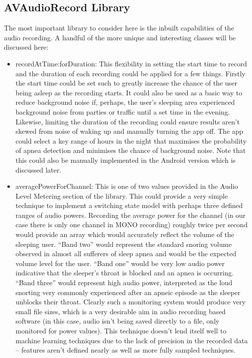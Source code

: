 \subsection{AVAudioRecord Library}
The most important library to consider here is the inbuilt capabilities of the audio recording. A handful of the more unique and interesting classes will be discussed here:
\begin{itemize}
\item recordAtTime:forDuration: This flexibility in setting the start time to record and the duration of each recording could be applied for a few things. Firstly the start time could be set such to greatly increase the chance of the user being asleep as the recording starts. It could also be used as a basic way to reduce background noise if, perhaps, the user’s sleeping area experienced background noise from parties or traffic until a set time in the evening. Likewise, limiting the duration of the recording could ensure results aren’t skewed from noise of waking up and manually turning the app off. The app could select a key range of hours in the night that maximises the probability of apnea detection and minimises the chance of background noise. Note that this could also be manually implemented in the Android version which is discussed later.
\item averagePowerForChannel: This is one of two values provided in the Audio Level Metering section of the library. This could provide a very simple technique to implement a switching state model with perhaps three defined ranges of audio powers. Recording the average power for the channel (in our case there is only one channel in MONO recording) roughly twice per second would provide an array which would accurately reflect the volume of the sleeping user. ``Band two'' would represent the standard snoring volume observed in almost all sufferers of sleep apnea and would be the expected volume level for the user. ``Band one'' would be very low audio power indicative that the sleeper’s throat is blocked and an apnea is occurring. ``Band three'' would represent high audio power, interpreted as the loud snorting very commonly experienced after an apneic episode as the sleeper unblocks their throat. Clearly such a monitoring system would produce very small file sizes, which is a very desirable aim in audio recording based software (in this case, audio isn’t being saved directly to a file, only monitored for power values). This technique doesn’t lend itself well to machine learning techniques due to the lack of precision in the recorded data – features aren’t defined nearly as well as more fully sampled techniques.

\end{itemize}
